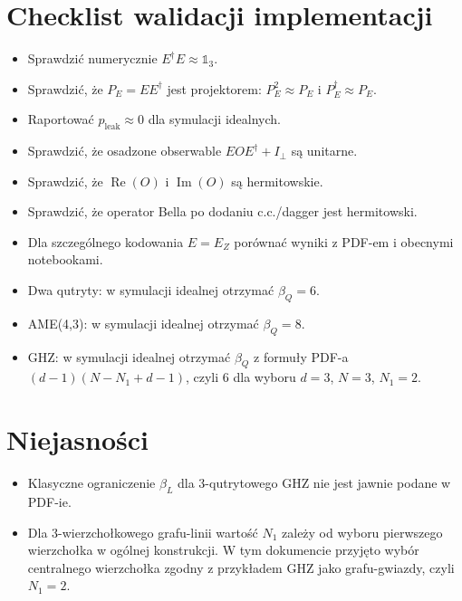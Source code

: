 \documentclass[12pt]{article}
\newcommand{\id}{\mathbb{1}}
\begin{document}
\section{Checklist walidacji implementacji}

\begin{itemize}
    \item Sprawdzi\'c numerycznie $E^\dagger E\approx \id_3$.
    \item Sprawdzi\'c, \.ze $P_E=EE^\dagger$ jest projektorem:
    $P_E^2\approx P_E$ i $P_E^\dagger\approx P_E$.
    \item Raportowa\'c $p_{\mathrm{leak}}\approx 0$ dla symulacji idealnych.
    \item Sprawdzi\'c, \.ze osadzone obserwable $EOE^\dagger+I_\perp$ s\k{a} unitarne.
    \item Sprawdzi\'c, \.ze $\operatorname{Re}(O)$ i $\operatorname{Im}(O)$ s\k{a}
    hermitowskie.
    \item Sprawdzi\'c, \.ze operator Bella po dodaniu c.c./dagger jest hermitowski.
    \item Dla szczeg\'olnego kodowania $E=E_Z$ por\'owna\'c wyniki z PDF-em i obecnymi
    notebookami.
    \item Dwa qutryty: w symulacji idealnej otrzyma\'c $\beta_Q=6$.
    \item AME(4,3): w symulacji idealnej otrzyma\'c $\beta_Q=8$.
    \item GHZ: w symulacji idealnej otrzyma\'c $\beta_Q$ z formu\l{}y PDF-a
    $(d-1)(N-N_1+d-1)$, czyli $6$ dla wyboru $d=3$, $N=3$, $N_1=2$.
\end{itemize}

\section{Niejasno\'sci}

\begin{itemize}
    \item Klasyczne ograniczenie $\beta_L$ dla 3-qutrytowego GHZ nie jest jawnie podane w PDF-ie.
    \item Dla 3-wierzcho\l{}kowego grafu-linii warto\'s\'c $N_1$ zale\.zy od wyboru pierwszego
    wierzcho\l{}ka w og\'olnej konstrukcji. W tym dokumencie przyj\k{e}to wyb\'or centralnego
    wierzcho\l{}ka zgodny z przyk\l{}adem GHZ jako grafu-gwiazdy, czyli $N_1=2$.
\end{itemize}
\end{document}
